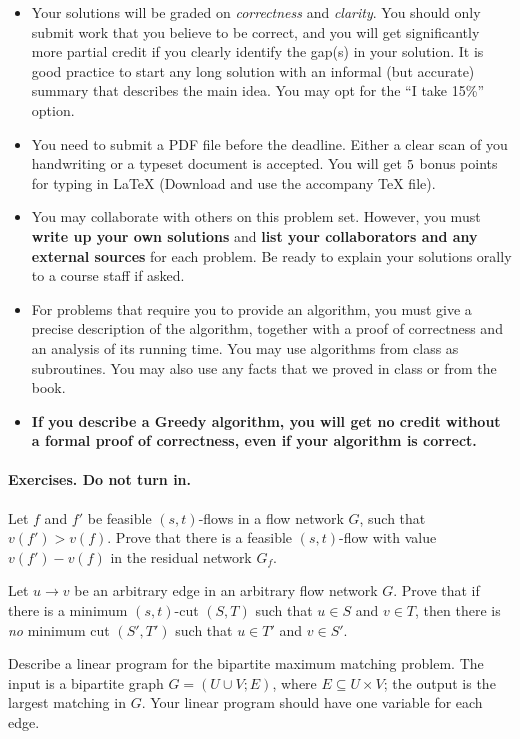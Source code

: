 \begin{itemize}
\item Your solutions will be graded on \emph{correctness} and
  \emph{clarity}. You should only submit work that you believe to be
  correct, and you will get significantly more partial credit if you
  clearly identify the gap(s) in your solution. It is good practice to
  start any long solution with an informal (but accurate) summary that
  describes the main idea. You may opt for the ``I take 15\%'' option.

\item You need to submit a PDF file before the deadline. Either a
  clear scan of you handwriting or a typeset document is accepted. You
  will get $5$ bonus points for typing in LaTeX (Download and use
  the accompany TeX file).

\item You may collaborate with others on this problem set. However,
  you must \textbf{{write up your own solutions}} and \textbf{{list
      your collaborators and any external sources}} for each
  problem. Be ready to explain your solutions orally to a course staff
  if asked.

\item For problems that require you to provide an algorithm, you must
  give a precise description of the algorithm, together with a proof
  of correctness and an analysis of its running time. You may use
  algorithms from class as subroutines. You may also use any facts
  that we proved in class or from the book.

\item \textbf{If you describe a Greedy algorithm, you will get no
    credit without a formal proof of correctness, even if your
    algorithm is correct.}

\end{itemize}
\paragraph{Exercises. Do not turn in.}
\begin{questions}
\question Let $f$ and $f'$ be feasible $(s,t)$-flows in a flow network
  $G$, such that $v(f') > v(f)$. Prove that there is a feasible
  $(s,t)$-flow with value $v(f') - v(f)$ in the residual network
  $G_f$.

\question Let $u\to v$ be an arbitrary edge in an arbitrary flow
  network $G$. Prove that if there is a minimum $(s,t)$-cut $(S,T)$
  such that $u\in S$ and $v\in T$, then there is \emph{no} minimum cut
  $(S',T')$ such that $u\in T'$ and $v\in S'$.

  \question Describe a linear program for the bipartite maximum
  matching problem. The input is a bipartite graph
  $G = (U \cup V; E)$, where $E \subseteq U \times V$; the output is
  the largest matching in $G$. Your linear program should have one
  variable for each edge.

\end{questions}
\newpage 
